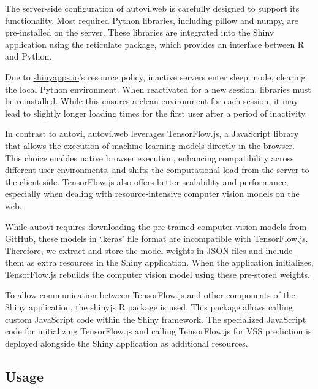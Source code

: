 \documentclass[
doublespace,
  times]{anzsauth}
\begin{document}
The server-side configuration of \textsf{autovi.web} is carefully
designed to support its functionality. Most required \textsf{Python}
libraries, including \textsf{pillow} and \textsf{numpy}, are
pre-installed on the server. These libraries are integrated into the
\textsf{Shiny} application using the \textsf{reticulate} package, which
provides an interface between \textsf{R} and \textsf{Python}.

Due to \href{https://www.shinyapps.io}{shinyapps.io}'s resource policy,
inactive servers enter sleep mode, clearing the local \textsf{Python}
environment. When reactivated for a new session, libraries must be
reinstalled. While this ensures a clean environment for each session, it
may lead to slightly longer loading times for the first user after a
period of inactivity.

In contrast to \textsf{autovi}, \textsf{autovi.web} leverages
\textsf{TensorFlow.js}, a \textsf{JavaScript} library that allows the
execution of machine learning models directly in the browser. This
choice enables native browser execution, enhancing compatibility across
different user environments, and shifts the computational load from the
server to the client-side. \textsf{TensorFlow.js} also offers better
scalability and performance, especially when dealing with
resource-intensive computer vision models on the web.

While \textsf{autovi} requires downloading the pre-trained computer
vision models from GitHub, these models in `.keras' file format are
incompatible with \textsf{TensorFlow.js}. Therefore, we extract and
store the model weights in JSON files and include them as extra
resources in the \textsf{Shiny} application. When the application
initializes, \textsf{TensorFlow.js} rebuilds the computer vision model
using these pre-stored weights.

To allow communication between \textsf{TensorFlow.js} and other
components of the \textsf{Shiny} application, the \textsf{shinyjs}
\textsf{R} package \citep{shinyjs} is used. This package allows calling
custom \textsf{JavaScript} code within the \textsf{Shiny} framework. The
specialized \textsf{JavaScript} code for initializing
\textsf{TensorFlow.js} and calling \textsf{TensorFlow.js} for VSS
prediction is deployed alongside the \textsf{Shiny} application as
additional resources.

\subsection{Usage}\label{sec-autovi-web-workflow}
\end{document}
